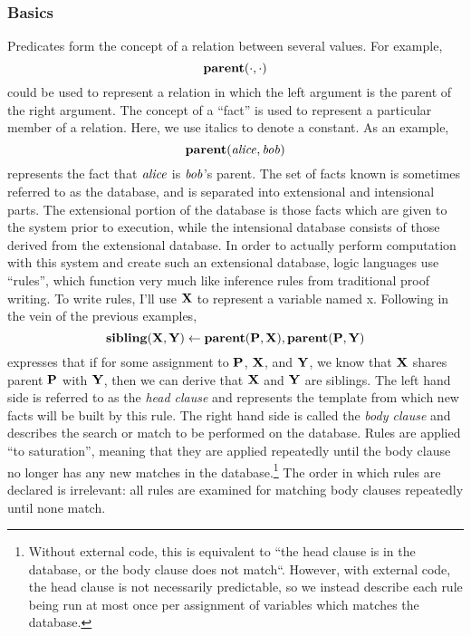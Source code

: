 \subsubsection{Basics}
Predicates form the concept of a relation between several values.
For example,
\[
        {\bf parent}(\cdot, \cdot)
\]
could be used to represent a relation in which the left argument is the parent of the right argument.
The concept of a ``fact'' is used to represent a particular member of a relation.
Here, we use italics to denote a constant.
As an example,
\[
        {\bf parent}({\it alice}, {\it bob})
\]
represents the fact that ${\it alice}$ is ${\it bob}$'s parent.
The set of facts known is sometimes referred to as the database, and is separated into extensional and intensional parts.
The extensional portion of the database is those facts which are given to the system prior to execution, while the intensional database consists of those derived from the extensional database.
In order to actually perform computation with this system and create such an extensional database, logic languages use ``rules'', which function very much like inference rules from traditional proof writing.
To write rules, I'll use ${\bf X}$ to represent a variable named x.
Following in the vein of the previous examples,
\[
        {\bf sibling}({\bf X}, {\bf Y}) \leftarrow {\bf parent}({\bf P}, {\bf X}), {\bf parent}({\bf P}, {\bf Y})
\]
expresses that if for some assignment to ${\bf P}$, ${\bf X}$, and ${\bf Y}$, we know that ${\bf X}$ shares parent ${\bf P}$ with ${\bf Y}$, then we can derive that ${\bf X}$ and ${\bf Y}$ are siblings.
The left hand side is referred to as the \emph{head clause} and represents the template from which new facts will be built by this rule.
The right hand side is called the \emph{body clause} and describes the search or match to be performed on the database.
Rules are applied ``to saturation'', meaning that they are applied repeatedly until the body clause no longer has any new matches in the database.\footnote {
Without external code, this is equivalent to ``the head clause is in the database, or the body clause does not match``. However, with external code, the head clause is not necessarily predictable, so we instead describe each rule being run at most once per assignment of variables which matches the database.
}
The order in which rules are declared is irrelevant: all rules are examined for matching body clauses repeatedly until none match.
